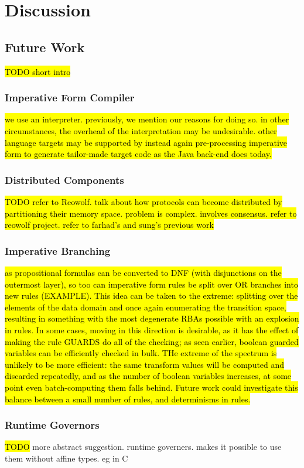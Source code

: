 \chapter{Discussion}
\label{sec:discussion}
\section{Future Work}
\hl{TODO short intro}
\subsection{Imperative Form Compiler}
\hl{we use an interpreter. previously, we mention our reasons for doing so. in other circumstances, the overhead of the interpretation may be undesirable. other language targets may be supported by instead again pre-processing imperative form to generate tailor-made target code as the Java back-end does today.}
\subsection{Distributed Components}
\hl{TODO refer to Reowolf. talk about how protocols can become distributed by partitioning their memory space. problem is complex. involves consensus. refer to reowolf project. refer to farhad's and sung's previous work}
\subsection{Imperative Branching}
\hl{as propositional formulas can be converted to DNF (with disjunctions on the outermost layer), so too can imperative form rules be split over OR branches into new rules (EXAMPLE). This idea can be taken to the extreme: splitting over the elements of the data domain and once again enumerating the transition space, resulting in something with the most degenerate RBAs possible with an explosion in rules. In some cases, moving in this direction is desirable, as it has the effect of making the rule GUARDS do all of the checking; as seen earlier, boolean guarded variables can be efficiently checked in bulk. THe extreme of the spectrum is unlikely to be more efficient: the same transform values will be computed and discarded repeatedly, and as the number of boolean variables increases, at some point even batch-computing them falls behind. Future work could investigate this balance between a small number of rules, and determinisms in rules.}
\subsection{Runtime Governors}
\hl{TODO}
more abstract suggestion. runtime governers. makes it possible to use them without affine types. eg in C

